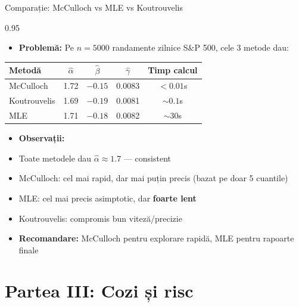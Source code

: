 \documentclass[9pt, aspectratio=169, t]{beamer}
\begin{document}
\begin{frame}{Comparație: McCulloch vs MLE vs Koutrouvelis}
    \begin{cminipage}{0.95\textwidth}
\begin{itemize}\setlength{\itemsep}{0pt}
    \item \textbf{Problemă:} Pe $n = 5000$ randamente zilnice S\&P 500, cele 3 metode dau:
\end{itemize}

\vspace{0.2cm}
\renewcommand{\arraystretch}{1.3}
\begin{center}
\begin{tabular}{lcccc}
\toprule
\textbf{Metodă} & $\hat{\alpha}$ & $\hat{\beta}$ & $\hat{\gamma}$ & \textbf{Timp calcul} \\
\midrule
McCulloch & 1.72 & $-0.15$ & 0.0083 & $< 0.01$s \\
Koutrouvelis & 1.69 & $-0.19$ & 0.0081 & $\sim 0.1$s \\
MLE & 1.71 & $-0.18$ & 0.0082 & $\sim 30$s \\
\bottomrule
\end{tabular}
\end{center}

\begin{itemize}\setlength{\itemsep}{0pt}
    \item \textbf{Observații:}
    \item Toate metodele dau $\hat{\alpha} \approx 1.7$ --- consistent
    \item McCulloch: cel mai rapid, dar mai puțin precis (bazat pe doar 5 cuantile)
    \item MLE: cel mai precis asimptotic, dar \textbf{foarte lent}
    \item Koutrouvelis: compromis bun viteză/precizie
    \item \textbf{Recomandare:} McCulloch pentru explorare rapidă, MLE pentru rapoarte finale
\end{itemize}
    \end{cminipage}
\end{frame}

\section{Partea III: Cozi și risc}
\end{document}
